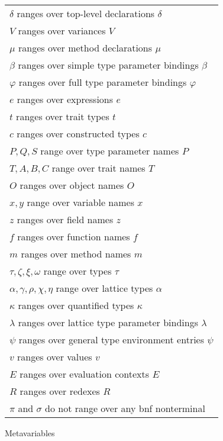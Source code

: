 
\begin{figure}

\begin{tabular}[t]{@{}l@{}}
$\delta$ ranges over top-level declarations $\delta$ \\
$V$ ranges over variances $V$ \\
$\mu$ ranges over method declarations $\mu$ \\
$\beta$ ranges over simple type parameter bindings $\beta$ \\
$\varphi$ ranges over full type parameter bindings $\varphi$ \\
$e$ ranges over expressions $e$ \\
$t$ ranges over trait types $t$ \\
$c$ ranges over constructed types $c$ \\
$P, Q, S$ range over type parameter names $P$ \\
$T, A, B, C$ range over trait names $T$ \\
$O$ ranges over object names $O$ \\
$x, y$ range over variable names $x$ \\
$z$ ranges over field names $z$ \\
$f$ ranges over function names $f$ \\
$m$ ranges over method names $m$ \\
$\tau, \zeta, \xi, \omega$ range over types $\tau$ \\
$\alpha, \gamma, \rho, \chi, \eta$ range over lattice types $\alpha$ \\
$\kappa$ ranges over quantified types $\kappa$ \\
$\lambda$ ranges over lattice type parameter bindings $\lambda$ \\
$\psi$ ranges over general type environment entries $\psi$ \\
$v$ ranges over values $v$ \\
$E$ ranges over evaluation contexts $E$ \\
$R$ ranges over redexes $R$ \\[6pt]
$\pi$ and $\sigma$ do not range over any {\sc bnf} nonterminal
\end{tabular}

\caption{Metavariables}
\label{fig:metavariables}
\end{figure}




